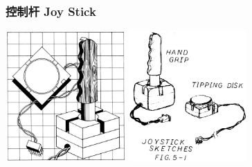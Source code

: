 \documentclass{beamer}
\begin{document}
\begin{frame}
	\frametitle{控制杆 Joy Stick}
	\begin{center}
	\includegraphics[height=5cm]{images/joystick-prototype-fig1.jpg}
	\includegraphics[height=5cm]{images/joystick-prototype-fig2.jpg}
	\end{center}
\end{frame}
\end{document}
